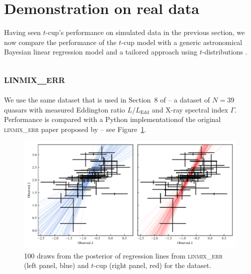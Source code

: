 \documentclass[fleqn,usenatbib]{rasti}
\begin{document}
\section{Demonstration on real data}
\label{sec:real-world}

Having seen $t$-cup's performance on simulated data in the previous section, we
now compare the performance of the $t$-cup model with a generic astronomical
Bayesian linear regression model \citep[\textsc{linmix\_err};][]{Kelly:2007} and
a tailored approach using $t$-distributions \citep{Park:2017}.

\subsection{\textsc{linmix\_err}}

We use the same dataset that is used in Section~8 of \citet{Kelly:2007} -- a
dataset of $N = 39$ quasars with measured Eddington ratio $L / L_{\text{Edd}}$
and X-ray spectral index $\Gamma$. Performance is compared with a Python
implementation\footnotemark of the original \textsc{linmix\_err} paper proposed
by \citeauthor{Kelly:2007} -- see Figure~\ref{fig:real-world.kelly.regression}.


\begin{figure}
    \includegraphics[width=\linewidth]{graphics/real/regression_kelly.pdf}
    \caption{100 draws from the posterior of regression lines from
    \textsc{linmix\_err} (left panel, blue) and $t$-cup (right panel, red) for
    the \citet{Kelly:2007} dataset.}
    \label{fig:real-world.kelly.regression}
\end{figure}
\end{document}
